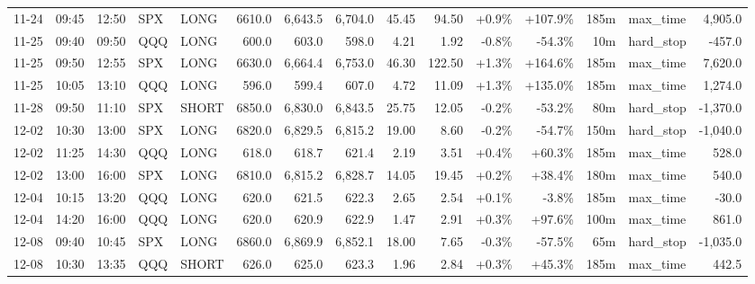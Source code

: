 \documentclass[11pt,a4paper,twoside]{article}
\begin{document}
\begin{landscape}
\begin{center}
\begin{longtable}{>{\color{txtmain}}l l l l l r r r r r r r r >{\color{txtmain}}l r}
11-24 & 09:45 & 12:50 & SPX & LONG & 6610.0 & 6,643.5 & 6,704.0 & 45.45 & 94.50 & \textcolor{wingreen}{+0.9\%} & \textcolor{wingreen}{+107.9\%} & 185m & max\_time & \textcolor{wingreen}{4,905.0} \\
11-25 & 09:40 & 09:50 & QQQ & LONG & 600.0 & 603.0 & 598.0 & 4.21 & 1.92 & \textcolor{lossred}{-0.8\%} & \textcolor{lossred}{-54.3\%} & 10m & hard\_stop & \textcolor{lossred}{-457.0} \\
11-25 & 09:50 & 12:55 & SPX & LONG & 6630.0 & 6,664.4 & 6,753.0 & 46.30 & 122.50 & \textcolor{wingreen}{+1.3\%} & \textcolor{wingreen}{+164.6\%} & 185m & max\_time & \textcolor{wingreen}{7,620.0} \\
11-25 & 10:05 & 13:10 & QQQ & LONG & 596.0 & 599.4 & 607.0 & 4.72 & 11.09 & \textcolor{wingreen}{+1.3\%} & \textcolor{wingreen}{+135.0\%} & 185m & max\_time & \textcolor{wingreen}{1,274.0} \\
11-28 & 09:50 & 11:10 & SPX & SHORT & 6850.0 & 6,830.0 & 6,843.5 & 25.75 & 12.05 & \textcolor{lossred}{-0.2\%} & \textcolor{lossred}{-53.2\%} & 80m & hard\_stop & \textcolor{lossred}{-1,370.0} \\
12-02 & 10:30 & 13:00 & SPX & LONG & 6820.0 & 6,829.5 & 6,815.2 & 19.00 & 8.60 & \textcolor{lossred}{-0.2\%} & \textcolor{lossred}{-54.7\%} & 150m & hard\_stop & \textcolor{lossred}{-1,040.0} \\
12-02 & 11:25 & 14:30 & QQQ & LONG & 618.0 & 618.7 & 621.4 & 2.19 & 3.51 & \textcolor{wingreen}{+0.4\%} & \textcolor{wingreen}{+60.3\%} & 185m & max\_time & \textcolor{wingreen}{528.0} \\
12-02 & 13:00 & 16:00 & SPX & LONG & 6810.0 & 6,815.2 & 6,828.7 & 14.05 & 19.45 & \textcolor{wingreen}{+0.2\%} & \textcolor{wingreen}{+38.4\%} & 180m & max\_time & \textcolor{wingreen}{540.0} \\
12-04 & 10:15 & 13:20 & QQQ & LONG & 620.0 & 621.5 & 622.3 & 2.65 & 2.54 & \textcolor{wingreen}{+0.1\%} & \textcolor{lossred}{-3.8\%} & 185m & max\_time & \textcolor{lossred}{-30.0} \\
12-04 & 14:20 & 16:00 & QQQ & LONG & 620.0 & 620.9 & 622.9 & 1.47 & 2.91 & \textcolor{wingreen}{+0.3\%} & \textcolor{wingreen}{+97.6\%} & 100m & max\_time & \textcolor{wingreen}{861.0} \\
12-08 & 09:40 & 10:45 & SPX & LONG & 6860.0 & 6,869.9 & 6,852.1 & 18.00 & 7.65 & \textcolor{lossred}{-0.3\%} & \textcolor{lossred}{-57.5\%} & 65m & hard\_stop & \textcolor{lossred}{-1,035.0} \\
12-08 & 10:30 & 13:35 & QQQ & SHORT & 626.0 & 625.0 & 623.3 & 1.96 & 2.84 & \textcolor{wingreen}{+0.3\%} & \textcolor{wingreen}{+45.3\%} & 185m & max\_time & \textcolor{wingreen}{442.5} \\

\end{longtable}
\end{center}
\end{landscape}
\end{document}
